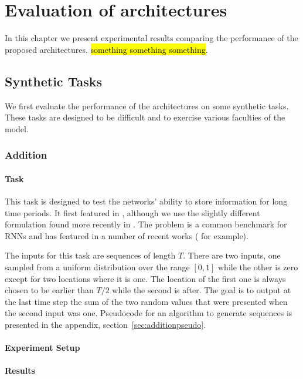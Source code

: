 
\chapter{Evaluation of architectures}\label{C:exps}
In this chapter we present experimental results comparing the performance of the proposed architectures.
\hl{something something something}.

\section{Synthetic Tasks}
We first evaluate the performance of the architectures on some synthetic tasks. These tasks are designed
to be difficult and to exercise various faculties of the model.

\subsection{Addition}
\subsubsection{Task}
This task is designed to test the networks' ability to store information for long time periods. It first
featured in \autocite{Hochreiter1997}, although we use the slightly different formulation found more 
recently in \autocite{Le2015}. The problem is a common benchmark for RNNs and has featured in a number of
recent works (\autocite{Arjovsky2015, Henaff2016, Barone2016, Neyshabur2016} for example).

The inputs for this task are sequences of length \(T\). There are two inputs, one sampled from a uniform
distribution over the range \([0,1]\) while the other is zero except for two locations where it is one.
The location of the first one is always chosen to be earlier than \(T/2\) while the second is after.
The goal is to output at the last time step the sum of the two random values that were presented when the
second input was one. Pseudocode for an algorithm to generate sequences is presented in the appendix,
section~\ref{sec:additionpseudo}.

\subsubsection{Experiment Setup}

\subsubsection{Results}

